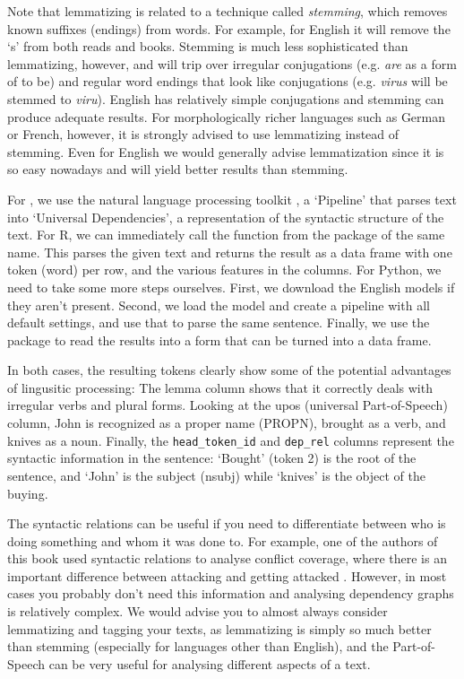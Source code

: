 Note that lemmatizing is related to a technique called \emph{stemming}, which removes known suffixes (endings) from words.
For example, for English it will remove the `s' from both reads and books.
Stemming is much less sophisticated than lemmatizing, however, and will trip over irregular conjugations
(e.g. \emph{are} as a form of to be) and regular word endings that look like conjugations (e.g. \emph{virus} will be stemmed to \emph{viru}).
English has relatively simple conjugations and stemming can produce adequate results.
For morphologically richer languages such as German or French, however, it is strongly advised to use lemmatizing instead of stemming.
Even for English we would generally advise lemmatization since it is so easy nowadays and will yield better results than stemming.

For , we use the  natural language processing toolkit \citep{udpipe},
a `Pipeline' that parses text into `Universal Dependencies', a representation of the syntactic structure of the text.
For R, we can immediately call the  function from the package of the same name.
This parses the given text and returns the result as a data frame with one token (word) per row,
and the various features in the columns.
For Python, we need to take some more steps ourselves.
First, we download the English models if they aren't present.
Second, we load the model and create a pipeline with all default settings,
and use that to parse the same sentence.
Finally, we use the  package to read the results into a form that can be turned into a data frame.

In both cases, the resulting tokens clearly show some of the potential advantages of lingusitic processing:
The lemma column shows that it correctly deals with irregular verbs and plural forms.
Looking at the upos (universal Part-of-Speech) column, John is recognized as a proper name (PROPN), brought as a verb, and knives as a noun.
Finally, the \verb|head_token_id| and \verb|dep_rel| columns represent the syntactic information in the sentence:
`Bought' (token 2) is the root of the sentence, and `John' is the subject (nsubj) while `knives' is the object of the buying.


The syntactic relations can be useful if you need to differentiate between who is doing something and whom it was done to.
For example, one of the authors of this book used syntactic relations to analyse conflict coverage,
where there is an important difference between attacking and getting attacked \citep{clause}.
However, in most cases you probably don't need this information and analysing dependency graphs is relatively complex.
We would advise you to almost always consider lemmatizing and tagging your texts, as lemmatizing is simply so much better than stemming
(especially for languages other than English), and the Part-of-Speech can be very useful for analysing different aspects of a text. 

